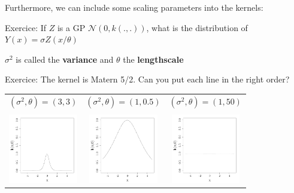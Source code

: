 \documentclass{beamer}
\begin{document}
\begin{frame}{}
Furthermore, we can include some scaling parameters into the kernels:
\begin{exampleblock}{Exercice:}
If $Z$ is a GP $\mathcal{N}(0,k(.,.))$, what is the distribution of $Y(x) = \sigma Z(x/\theta)$
\end{exampleblock}
\vspace{5mm}
$\sigma^2$ is called the \textbf{variance} and $\theta$ the \textbf{lengthscale}
\end{frame}

\begin{frame}{}
\begin{exampleblock}{Exercice: }
The kernel is Matern 5/2. Can you put each line in the right order?
\begin{center}
\begin{tabular}{ccc}
$(\sigma^2,\theta) = (3,3)$& $(\sigma^2,\theta)=(1,0.5)$& $(\sigma^2,\theta)=(1,50)$ \\ 
&&\\
\includegraphics[height=3cm]{figures/R/MVN_kern105} &\includegraphics[height=3cm]{figures/R/MVN_kern33}& \includegraphics[height=3cm]{figures/R/MVN_kern150}\\ 

\end{tabular}
\end{center}
\end{exampleblock}
\end{frame}
\end{document}
